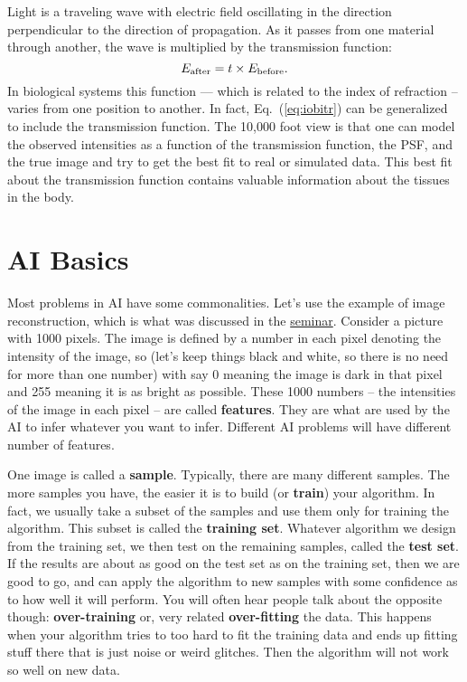 \documentclass[prd,amsmath,aps,floats,amssymb, floatfix,
  superscriptaddress,nofootinbib]{revtex4-1}
\newcommand{\ec}[1]{Eq.~(\ref{eq:#1})}
\numberwithin{equation}{section}
\newcommand\be{\begin{equation}}
\newcommand\ee{\end{equation}}
\begin{document}
Light is a traveling wave with electric field oscillating in the direction perpendicular to the direction of propagation. As it passes from one material through another, the wave is multiplied by the transmission function:
\be
E_{\rm after} = t\times E_{\rm before}
.\ee
In biological systems this function --- which is related to the index of refraction -- varies from one position to another. In fact, \ec{iobitr} can be generalized to include the transmission function. The 10,000 foot view is that one can model the observed intensities as a function of the transmission function, the PSF, and the true image and try to get the best fit to real or simulated data. This best fit about the transmission function contains valuable information about the tissues in the body.

\section{AI Basics}

Most problems in AI have some commonalities. Let's use the example of image reconstruction, which is what was discussed in the  \href{https://cmu.zoom.us/rec/share/2m9MSmtj6mbf7A_ueusvKnZIFItFV3HPI7QVJ7zlfSCCZGRzBt3iTHKs_fcKLJKx.3rNWZExDpw63YeTg}{seminar}. Consider a picture with 1000 pixels. The image is defined by a number in each pixel denoting the intensity of the image, so (let's keep things black and white, so there is no need for more than one number) with say 0 meaning the image is dark in that pixel and 255 meaning it is as bright as possible. These 1000 numbers -- the intensities of the image in each pixel -- are called {\bf features}. They are what are used by the AI to infer whatever you want to infer. Different AI problems will have different number of features. 

One image is called a {\bf sample}. Typically, there are many different samples. The more samples you have, the easier it is to build (or {\bf train}) your algorithm. In fact, we usually take a subset of the samples and use them only for training the algorithm. This subset is called the {\bf training set}. Whatever algorithm we design from the training set, we then test on the remaining samples, called the {\bf test set}. If the results are about as good on the test set as on the training set, then we are good to go, and can apply the algorithm to new samples with some confidence as to how well it will perform. You will often hear people talk about the opposite though: {\bf over-training} or, very related {\bf over-fitting} the data. This happens when your algorithm tries to too hard to fit the training data and ends up fitting stuff there that is just noise or weird glitches. Then the algorithm will not work so well on new data.
\end{document}
